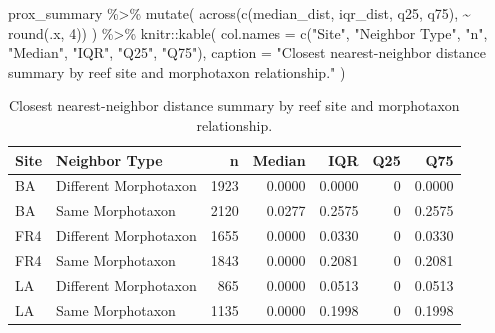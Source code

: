 \documentclass[
  letterpaper,
  DIV=11,
  numbers=noendperiod]{scrartcl}
\newenvironment{Shaded}{\begin{snugshade}}{\end{snugshade}}
\newcommand{\AttributeTok}[1]{\textcolor[rgb]{0.40,0.45,0.13}{#1}}
\newcommand{\DecValTok}[1]{\textcolor[rgb]{0.68,0.00,0.00}{#1}}
\newcommand{\FunctionTok}[1]{\textcolor[rgb]{0.28,0.35,0.67}{#1}}
\newcommand{\NormalTok}[1]{\textcolor[rgb]{0.00,0.23,0.31}{#1}}
\newcommand{\SpecialCharTok}[1]{\textcolor[rgb]{0.37,0.37,0.37}{#1}}
\newcommand{\StringTok}[1]{\textcolor[rgb]{0.13,0.47,0.30}{#1}}
\begin{document}
\begin{Shaded}
\begin{Highlighting}[]
\NormalTok{prox\_summary }\SpecialCharTok{\%\textgreater{}\%}
  \FunctionTok{mutate}\NormalTok{(}
    \FunctionTok{across}\NormalTok{(}\FunctionTok{c}\NormalTok{(median\_dist, iqr\_dist, q25, q75), }\SpecialCharTok{\textasciitilde{}} \FunctionTok{round}\NormalTok{(.x, }\DecValTok{4}\NormalTok{))}
\NormalTok{  ) }\SpecialCharTok{\%\textgreater{}\%}
\NormalTok{  knitr}\SpecialCharTok{::}\FunctionTok{kable}\NormalTok{(}
    \AttributeTok{col.names =} \FunctionTok{c}\NormalTok{(}\StringTok{"Site"}\NormalTok{, }\StringTok{"Neighbor Type"}\NormalTok{, }\StringTok{"n"}\NormalTok{, }\StringTok{"Median"}\NormalTok{, }\StringTok{"IQR"}\NormalTok{, }\StringTok{"Q25"}\NormalTok{, }\StringTok{"Q75"}\NormalTok{),}
    \AttributeTok{caption =} \StringTok{"Closest nearest{-}neighbor distance summary by reef site and morphotaxon relationship."}
\NormalTok{  )}
\end{Highlighting}
\end{Shaded}

\begin{longtable}[]{@{}llrrrrr@{}}

\caption{\label{tbl-proximity-summary}Closest nearest-neighbor distance
summary by reef site and morphotaxon relationship.}

\tabularnewline

\toprule\noalign{}
Site & Neighbor Type & n & Median & IQR & Q25 & Q75 \\
\midrule\noalign{}
\endhead
\bottomrule\noalign{}
\endlastfoot
BA & Different Morphotaxon & 1923 & 0.0000 & 0.0000 & 0 & 0.0000 \\
BA & Same Morphotaxon & 2120 & 0.0277 & 0.2575 & 0 & 0.2575 \\
FR4 & Different Morphotaxon & 1655 & 0.0000 & 0.0330 & 0 & 0.0330 \\
FR4 & Same Morphotaxon & 1843 & 0.0000 & 0.2081 & 0 & 0.2081 \\
LA & Different Morphotaxon & 865 & 0.0000 & 0.0513 & 0 & 0.0513 \\
LA & Same Morphotaxon & 1135 & 0.0000 & 0.1998 & 0 & 0.1998 \\

\end{longtable}
\end{document}
